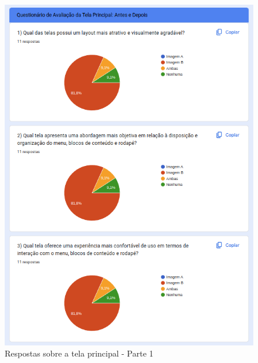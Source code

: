 \begin{figure}[!h]
	\begin{center}
	    \includegraphics[scale=0.7]{figs/Answers/Professionals/12.png}
	\end{center}
	\caption{\label{APC_TP01}Respostas sobre a tela principal - Parte 1}
\end{figure}

\newpage

